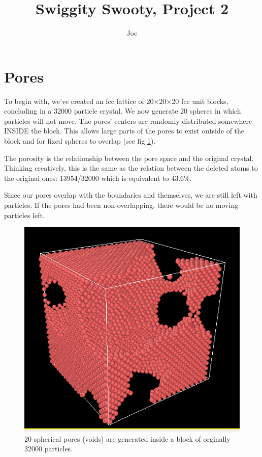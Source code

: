 \documentclass[a4paper,10pt]{article}
\title{Swiggity Swooty, Project 2}
\author{Joe}
\begin{document}
\maketitle

\section{Pores}
To begin with, we've created an fcc lattice of 20$\times$20$\times$20 fcc unit blocks, concluding in a 32000 particle crystal. We now generate 20 spheres in which particles will not move.
The pores' centers are randomly distributed somewhere INSIDE the block. This allows large parts of the pores to exist outside of the block and for fixed spheres to overlap (see fig \ref{fig1}).


The porosity is the relationship between the pore space and the original crystal. Thinking creatively, this is the same as the relation between the deleted atoms to the original ones:
13954/32000 which is equivalent to $43.6\%$.

Since our pores overlap with the boundaries and themselves, we are still left with particles. If the pores had been non-overlapping, there would be no moving particles left.
\begin{figure}\centering
 \includegraphics[width=0.55\linewidth]{pore}
 \caption{20 spherical pores (voids) are generated inside a block of orginally 32000 particles.}
 \label{fig1}
\end{figure}
\end{document}
